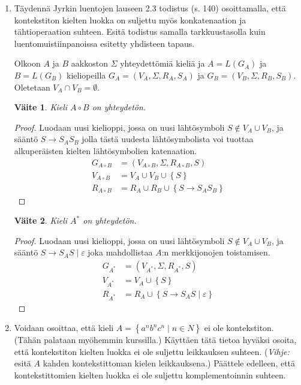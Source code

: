 \documentclass[a4paper,11pt]{article}
\newtheorem*{claim}{Väite}
\newcommand{\set}[1]{{\left\{ #1 \right\}}}
\begin{document}
\begin{enumerate}
\item
  Täydennä Jyrkin luentojen lauseen 2.3 todistus (s. 140)
  osoittamalla, että kontekstiton kielten luokka on suljettu myös
  konkatenaation ja tähtioperaation suhteen. Esitä todistus samalla
  tarkkuustasolla kuin luentomuistiinpanoissa esitetty yhdisteen
  tapaus.
  
  Olkoon $A$ ja $B$ aakkoston $\Sigma$ yhteydettömiä kieliä ja $A =
  L(G_A)$ ja $B = L(G_B)$ kieliopeilla $G_A = (V_A, \Sigma, R_A, S_A)$
  ja $G_B = (V_B, \Sigma, R_B, S_B)$. Oletetaan $V_A \cap V_B =
  \emptyset$.
%
  \begin{claim}
    Kieli $A \circ B$ on yhteydetön.
  \end{claim}
  \begin{proof}
    Luodaan uusi kielioppi, jossa on uusi lähtösymboli $S \notin V_A
    \cup V_B$, ja sääntö $S \to S_AS_B$ jolla tästä uudesta
    lähtösymbolista voi tuottaa alkuperäisten kielten lähtösymbolien
    katenaation.
    \begin{align*}
      G_{A \circ B} & = (V_{A \circ B}, \Sigma, R_{A \circ B}, S) \\
      V_{A \circ B} & = V_A \cup V_B \cup \set{S} \\
      R_{A \circ B} & = R_A \cup R_B \cup \set{S \to S_AS_B}
    \end{align*}
  \end{proof}
%
  \begin{claim}
    Kieli $A^*$ on yhteydetön.
  \end{claim}
  \begin{proof}
    Luodaan uusi kielioppi, jossa on uusi lähtösymboli $S \notin V_A
    \cup V_B$, ja sääntö $S \to S_AS \mid \varepsilon$ joka
    mahdollistaa $A$:n merkkijonojen toistamisen.
    \begin{align*}
      G_{A^*} & = (V_{A^*}, \Sigma, R_{A^*}, S) \\
      V_{A^*} & = V_A \cup \set{S} \\
      R_{A^*} & = R_A \cup \set{S \to S_AS \mid \varepsilon}
    \end{align*}
  \end{proof}

\item
  Voidaan osoittaa, että kieli $A=\set{ a^n b^n c^n\mid n\in N}$ ei
  ole kontekstiton. (Tähän palataan myöhemmin kurssilla.) Käyttäen
  tätä tietoa hyväksi osoita, että kontekstiton kielten luokka ei ole
  suljettu leikkauksen suhteen. ({\em Vihje:} esitä $A$ kahden
  kontekstittoman kielen leikkauksena.) Päättele edelleen, että
  kontekstittomien kielten luokka ei ole suljettu komplementoinnin
  suhteen.


\end{enumerate}
\end{document}
